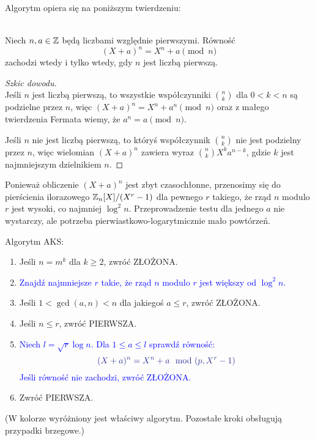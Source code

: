 Algorytm opiera się na poniższym twierdzeniu:

\begin{theorem} \\
Niech \( n, a \in \mathbb{Z} \) będą liczbami względnie pierwszymi. Równość
\[
    (X + a)^n = X^n + a \pmod{n}
\]
zachodzi wtedy i tylko wtedy, gdy \( n \) jest liczbą pierwszą.
\end{theorem}
\begin{proof}[Szkic dowodu]\\
Jeśli \( n \) jest liczbą pierwszą, to wszystkie współczynniki \( n \choose k \) dla \( 0 < k < n \) są podzielne przez \( n \), więc \( (X + a)^n = X^n + a^n \pmod{n} \) oraz z małego twierdzenia Fermata wiemy, że \( a^n = a \pmod{n} \).

Jeśli \( n \) nie jest liczbą pierwszą, to któryś współczynnik \( n \choose k \) nie jest podzielny przez \( n \), więc wielomian \( (X + a)^n \) zawiera wyraz \( {n \choose k} X^ka^{n-k} \), gdzie \( k \) jest najmniejszym dzielnikiem \( n \).
\end{proof}

Ponieważ obliczenie \( (X + a)^n \) jest zbyt czasochłonne, przenosimy się do pierścienia ilorazowego \( \mathbb{Z}_n[X]/(X^r - 1) \) dla pewnego \( r \) takiego, że rząd \( n \)
modulo \( r \) jest wysoki, co najmniej \( \log^2n \). Przeprowadzenie testu dla jednego \( a \) nie wystarczy, ale potrzeba pierwiastkowo-logarytmicznie mało powtórzeń.

\newpage
\begin{greyframe}
    Algorytm AKS:
    \begin{enumerate}
        \item Jeśli \( n = m^k \) dla \( k \geq 2 \), zwróć ZŁOŻONA.
        \item \textcolor{Blue}{Znajdź najmniejsze \( r \) takie, że rząd \( n \) modulo \( r \) jest większy od \( \log^2n \).}
        \item Jeśli \( 1 < \gcd(a, n) < n \) dla jakiegoś \( a \leq r \), zwróć ZŁOŻONA.
        \item Jeśli \( n \leq r \), zwróć PIERWSZA.
        \item \textcolor{Blue}{Niech \( l = \sqrt{r}\log n \). Dla \( 1 \leq a \leq l \) sprawdź równość:}
        \[
            \textcolor{Blue}{(X + a)^n = X^n + a \mod (p, X^r-1)}
        \]
        \textcolor{Blue}{Jeśli równość nie zachodzi, zwróć ZŁOŻONA.}
        \item Zwróć PIERWSZA.
    \end{enumerate}
\end{greyframe}
{\small (W kolorze wyróżniony jest właściwy algorytm. Pozostałe kroki obsługują przypadki brzegowe.)}

